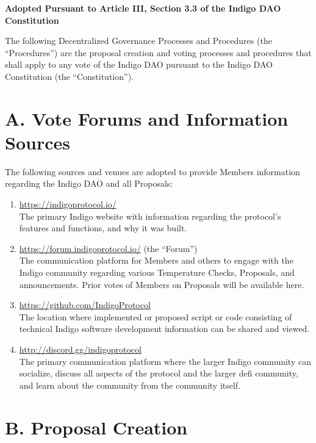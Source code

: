 \textbf{Adopted Pursuant to Article III, Section 3.3 of the Indigo DAO
Constitution}

The following Decentralized Governance Processes and Procedures (the
``Procedures'') are the proposal creation and voting processes and
procedures that shall apply to any vote of the Indigo DAO pursuant to
the Indigo DAO Constitution (the ``Constitution'').

\hypertarget{a.-vote-forums-and-information-sources}{%
\section{A. Vote Forums and Information
Sources}\label{a.-vote-forums-and-information-sources}}

The following sources and venues are adopted to provide Members
information regarding the Indigo DAO and all Proposals:

\begin{enumerate}
\item
  \url{https://indigoprotocol.io/}~\\
  The primary Indigo website with information regarding the protocol's
  features and functions, and why it was built.
\item
  \url{https://forum.indigoprotocol.io/} (the ``Forum'')\\
  The communication platform for Members and others to engage with the
  Indigo community regarding various Temperature Checks, Proposals, and
  announcements. Prior votes of Members on Proposals will be available
  here.
\item
  \url{https://github.com/IndigoProtocol}~\\
  The location where implemented or proposed script or code consisting
  of technical Indigo software development information can be shared and
  viewed.
\item
  \url{http://discord.gg/indigoprotocol}~\\
  The primary communication platform where the larger Indigo community
  can socialize, discuss all aspects of the protocol and the larger defi
  community, and learn about the community from the community itself.
\end{enumerate}

\hypertarget{b.-proposal-creation}{%
\section{B. Proposal Creation}\label{b.-proposal-creation}}

